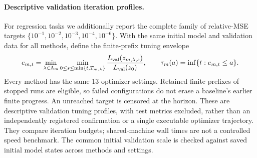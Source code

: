 \paragraph{Descriptive validation iteration profiles.}
For regression tasks we additionally report the complete family of
relative-MSE targets $\{10^{-1},10^{-2},10^{-3},10^{-4},10^{-6}\}$.
With the same initial model and validation data for all methods,
define the finite-prefix tuning envelope
\begin{equation}
 e_{m,t}=\min_{\lambda\in\Lambda_m}
 \min_{0\le s\le\min\{t,T_{m,\lambda}\}}
 \frac{L_{\rm val}(z_{m,\lambda,s})}{L_{\rm val}(z_0)},
 \qquad
 \tau_m(a)=\inf\{t:e_{m,t}\le a\}.
\end{equation}
Every method has the same 13 optimizer settings. Retained finite
prefixes of stopped runs are eligible, so failed configurations do not
erase a baseline's earlier finite progress. An unreached target is
censored at the horizon. These are descriptive validation tuning
profiles, with test metrics excluded, rather than an independently
registered confirmation or a single executable optimizer trajectory.
They compare iteration budgets; shared-machine wall times are not a
controlled speed benchmark. The common initial validation scale is
checked against saved initial model states across methods and settings.

\FloatBarrier

\FloatBarrier
